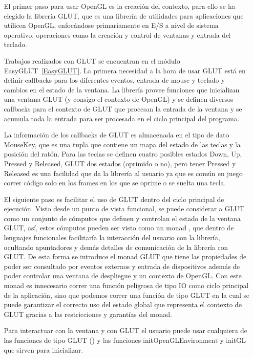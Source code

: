 El primer paso para usar OpenGL es la creación del contexto, para ello se ha elegido la librería GLUT, que es una librería de utilidades para aplicaciones que utilicen OpenGL, enfocándose primariamente en E/S a nivel de sistema operativo, operaciones como la creación y control de ventanas y entrada del teclado.

Trabajos realizados con GLUT se encuentran en el módulo EasyGLUT~\ref{EasyGLUT}. La primera necesidad a la hora de usar GLUT está en definir callbacks para los diferentes eventos, entrada de mouse y teclado y cambios en el estado de la ventana. La librería provee funciones que inicializan una ventana GLUT (y consigo el contexto de OpenGL) y se definen diversos callbacks para el contexto de GLUT que procesan la entrada de la ventana y se acumula toda la entrada para ser procesada en el ciclo principal del programa.

La información de los callbacks de GLUT es almacenada en el tipo de dato MouseKey, que es una tupla que contiene un mapa del estado de las teclas y la posición del ratón.  Para las teclas se definen cuatro posibles estados Down, Up, Pressed y Released, GLUT dos estados (oprimido o no), pero tener Pressed y Released es una facilidad que da la librería al usuario ya que es común en juego correr código solo en los frames en los que se oprime o se suelta una tecla.

El siguiente paso es facilitar el uso de GLUT dentro del ciclo principal de ejecución. Visto desde un punto de vista funcional, se puede considerar a GLUT como  un conjunto de cómputos que definen y controlan el estado de la ventana GLUT, así, estos cómputos pueden ser visto como un monad \cite{moggi1991notions} \cite{wiki:MonadsComputation} \cite{wiki:MonadsContainers}, que dentro de lenguajes funcionales facilitaría la interacción del usuario con la librería, ocultando apuntadores y demás detalles de comunicación de la librería con GLUT. De esta forma se introduce el monad GLUT que tiene las propiedades de poder ser consultado por eventos externos y entrada de dispositivos además de poder controlar una ventana de despliegue y un contexto de OpenGL. Con este monad es innecesario correr una función peligrosa de tipo IO como ciclo principal de la aplicación, sino que podemos correr una función de tipo GLUT en la cual se puede garantizar el correcto uso del estado global que representa el contexto de GLUT gracias a las restricciones y garantías del monad.

Para interactuar con la ventana y con GLUT el usuario puede usar cualquiera de las funciones de tipo GLUT () y las funciones initOpenGLEnvironment y initGL que sirven para inicializar.

